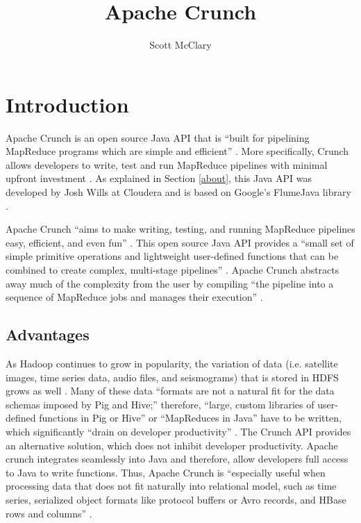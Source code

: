 \documentclass[9pt,twocolumn,twoside]{../../styles/osajnl}
\title{Apache Crunch}
\author[1,*]{Scott McClary}
\affil[1]{School of Informatics and Computing, Bloomington, IN 47408, U.S.A.}
\affil[*]{Corresponding authors: scmcclar@indiana.edu}
\begin{document}
\maketitle

\section{Introduction} \label{introduction} 
Apache Crunch is an open source Java API that is ``built for pipelining MapReduce programs which are simple and efficient'' \cite{www-hadoop-ecosystem}. More specifically, Crunch allows developers to write, test and run MapReduce pipelines with minimal upfront investment \cite{www-hadoop-ecosystem}. As explained in Section \ref{about}, this Java API was developed by Josh Wills at Cloudera and is based on Google's FlumeJava library \cite{FlumeJava-paper-2012, www-crunch-about}.  

Apache Crunch ``aims to make writing, testing, and running MapReduce pipelines easy, efficient, and even fun'' \cite{www-wills-crunch}. This open source Java API provides a ``small set of simple primitive operations and lightweight user-defined functions that can be combined to create complex, multi-stage pipelines'' \cite{www-wills-crunch}. Apache Crunch abstracts away much of the complexity from the user by compiling ``the pipeline into a sequence of MapReduce jobs and manages their execution'' \cite{www-wills-crunch}. 

\subsection{Advantages}
As Hadoop continues to grow in popularity, the variation of data (i.e. satellite images, time series data, audio files, and seismograms) that is stored in HDFS grows as well \cite{www-wills-crunch}. Many of these data ``formats are not a natural fit for the data schemas imposed by Pig and Hive;'' therefore, ``large, custom libraries of user-defined functions in Pig or Hive'' or ``MapReduces in Java'' have to be written, which significantly ``drain on developer productivity'' \cite{www-wills-crunch}. The Crunch API provides an alternative solution, which does not inhibit developer productivity. Apache crunch integrates seamlessly into Java and therefore, allow developers full access to Java to write functions. Thus, Apache Crunch is ``especially useful when processing data that does not fit naturally into relational model, such as time series, serialized object formats like protocol buffers or Avro records, and HBase rows and columns'' \cite{www-crunch-api}. 
\end{document}
